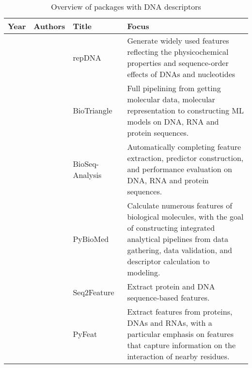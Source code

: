 \begin{table}[ht]
	\caption{Overview of packages with DNA descriptors}
	\label{tab:descriptors_DNA}
\centering
\begin{tabular}{lp{2cm}p{3.5cm}p{7cm}}
	\toprule
	\textbf{Year} & \textbf{Authors} & \textbf{Title} & \textbf{Focus}\\
	\midrule
	
	\citeyear{Liu2014RepDNA:Effects} & \citeauthor{Liu2014RepDNA:Effects} & repDNA~\cite{Liu2014RepDNA:Effects} & Generate widely used features reflecting the physicochemical properties and sequence-order effects of \gls{DNA}s and nucleotides \\\midrule
	
	\citeyear{Dong2016BioTriangle:Interactions} & \citeauthor{Dong2016BioTriangle:Interactions} & BioTriangle~\cite{Dong2016BioTriangle:Interactions} & Full pipelining from getting molecular data, molecular representation to constructing \gls{ML} models on \gls{DNA}, \gls{RNA} and protein sequences. \\\midrule
	
	\citeyear{Liu2017BioSeq-Analysis:Approaches} & \citeauthor{Liu2017BioSeq-Analysis:Approaches} & BioSeq-Analysis~\cite{Liu2017BioSeq-Analysis:Approaches} & Automatically completing feature extraction, predictor construction, and performance evaluation on \gls{DNA}, \gls{RNA} and protein sequences. \\\midrule
	
	\citeyear{Dong2018PyBioMed:Interactions} & \citeauthor{Dong2018PyBioMed:Interactions} & PyBioMed~\cite{Dong2018PyBioMed:Interactions} & Calculate numerous features of biological molecules, with the goal of constructing integrated analytical pipelines from data gathering, data validation, and descriptor calculation to modeling. \\\midrule
	
	\citeyear{Nikam2019Seq2Feature:Tool} & \citeauthor{Nikam2019Seq2Feature:Tool} & Seq2Feature~\cite{Nikam2019Seq2Feature:Tool} & Extract protein and \gls{DNA} sequence-based features.\\\midrule
	
	\citeyear{Muhammod2019PyFeat:Sequences} & \citeauthor{Muhammod2019PyFeat:Sequences} & PyFeat~\cite{Muhammod2019PyFeat:Sequences} & Extract features from proteins, \gls{DNA}s and \gls{RNA}s, with a particular emphasis on features that capture information on the interaction of nearby residues. \\\midrule
	

\end{tabular}
\end{table}
